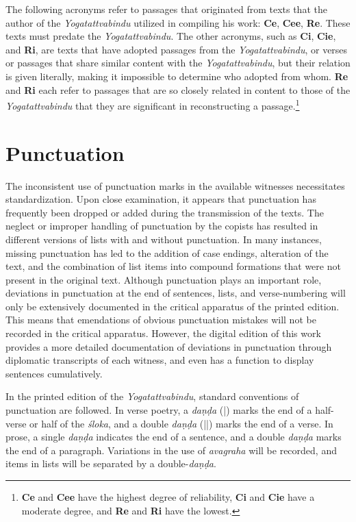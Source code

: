 The following acronyms refer to passages that originated from texts that the author of the \textit{Yogatattvabindu} utilized in compiling his work: \textbf{Ce}, \textbf{Cee}, \textbf{Re}. These texts must predate the \textit{Yogatattvabindu}. The other acronyms, such as \textbf{Ci}, \textbf{Cie}, and \textbf{Ri}, are texts that have adopted passages from the \textit{Yogatattvabindu}, or verses or passages that share similar content with the \textit{Yogatattvabindu}, but their relation is given literally, making it impossible to determine who adopted from whom. \textbf{Re} and \textbf{Ri} each refer to passages that are so closely related in content to those of the \textit{Yogatattvabindu} that they are significant in reconstructing a passage.\footnote{\textbf{Ce} and \textbf{Cee} have the highest degree of reliability, \textbf{Ci} and \textbf{Cie} have a moderate degree, and \textbf{Re} and \textbf{Ri} have the lowest.}

\section{Punctuation}

The inconsistent use of punctuation marks in the available witnesses necessitates standardization. Upon close examination, it appears that punctuation has frequently been dropped or added during the transmission of the texts. The neglect or improper handling of punctuation by the copists has resulted in different versions of lists with and without punctuation. In many instances, missing punctuation has led to the addition of case endings, alteration of the text, and the combination of list items into compound formations that were not present in the original text. Although punctuation plays an important role, deviations in punctuation at the end of sentences, lists, and verse-numbering will only be extensively documented in the critical apparatus of the printed edition. This means that emendations of obvious punctuation mistakes will not be recorded in the critical apparatus. However, the digital edition of this work provides a more detailed documentation of deviations in punctuation through diplomatic transcripts of each witness, and even has a function to display sentences cumulatively.

In the printed edition of the \textit{Yogatattvabindu}, standard conventions of punctuation are followed. In verse poetry, a \textit{daṇḍa} (|) marks the end of a half-verse or half of the \textit{śloka}, and a double \textit{daṇḍa} (||) marks the end of a verse. In prose, a single \textit{daṇḍa} indicates the end of a sentence, and a double \textit{daṇḍa} marks the end of a paragraph. Variations in the use of \textit{avagraha} will be recorded, and items in lists will be separated by a double-\textit{daṇḍa}.

